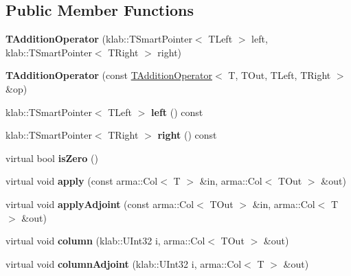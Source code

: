 \subsection*{Public Member Functions}
\begin{DoxyCompactItemize}
\item 
{\bfseries T\+Addition\+Operator} (klab\+::\+T\+Smart\+Pointer$<$ T\+Left $>$ left, klab\+::\+T\+Smart\+Pointer$<$ T\+Right $>$ right)\hypertarget{classkl1p_1_1TAdditionOperator_ae48d781ea7488b1162d83666b36e887e}{}\label{classkl1p_1_1TAdditionOperator_ae48d781ea7488b1162d83666b36e887e}

\item 
{\bfseries T\+Addition\+Operator} (const \hyperlink{classkl1p_1_1TAdditionOperator}{T\+Addition\+Operator}$<$ T, T\+Out, T\+Left, T\+Right $>$ \&op)\hypertarget{classkl1p_1_1TAdditionOperator_a5122e7ccb15ed359a9c745aa40c8d255}{}\label{classkl1p_1_1TAdditionOperator_a5122e7ccb15ed359a9c745aa40c8d255}

\item 
klab\+::\+T\+Smart\+Pointer$<$ T\+Left $>$ {\bfseries left} () const \hypertarget{classkl1p_1_1TAdditionOperator_ad1eb4454f7eab0092ae1d9c008cb6c86}{}\label{classkl1p_1_1TAdditionOperator_ad1eb4454f7eab0092ae1d9c008cb6c86}

\item 
klab\+::\+T\+Smart\+Pointer$<$ T\+Right $>$ {\bfseries right} () const \hypertarget{classkl1p_1_1TAdditionOperator_ae8b9b2d30bcdd7aa6ec91e62d2178287}{}\label{classkl1p_1_1TAdditionOperator_ae8b9b2d30bcdd7aa6ec91e62d2178287}

\item 
virtual bool {\bfseries is\+Zero} ()\hypertarget{classkl1p_1_1TAdditionOperator_afad4f1318aa73bedcce30510f854683d}{}\label{classkl1p_1_1TAdditionOperator_afad4f1318aa73bedcce30510f854683d}

\item 
virtual void {\bfseries apply} (const arma\+::\+Col$<$ T $>$ \&in, arma\+::\+Col$<$ T\+Out $>$ \&out)\hypertarget{classkl1p_1_1TAdditionOperator_ab7e87a2f9dbbafdd1d431e21f6be12c3}{}\label{classkl1p_1_1TAdditionOperator_ab7e87a2f9dbbafdd1d431e21f6be12c3}

\item 
virtual void {\bfseries apply\+Adjoint} (const arma\+::\+Col$<$ T\+Out $>$ \&in, arma\+::\+Col$<$ T $>$ \&out)\hypertarget{classkl1p_1_1TAdditionOperator_a7c9e9c1115ab76c9431dda3633655978}{}\label{classkl1p_1_1TAdditionOperator_a7c9e9c1115ab76c9431dda3633655978}

\item 
virtual void {\bfseries column} (klab\+::\+U\+Int32 i, arma\+::\+Col$<$ T\+Out $>$ \&out)\hypertarget{classkl1p_1_1TAdditionOperator_ae6adca8b253f5f6421ebf4b1dc24decb}{}\label{classkl1p_1_1TAdditionOperator_ae6adca8b253f5f6421ebf4b1dc24decb}

\item 
virtual void {\bfseries column\+Adjoint} (klab\+::\+U\+Int32 i, arma\+::\+Col$<$ T $>$ \&out)\hypertarget{classkl1p_1_1TAdditionOperator_ae38a23526e8749b90cb09cf77957262a}{}\label{classkl1p_1_1TAdditionOperator_ae38a23526e8749b90cb09cf77957262a}

\end{DoxyCompactItemize}
